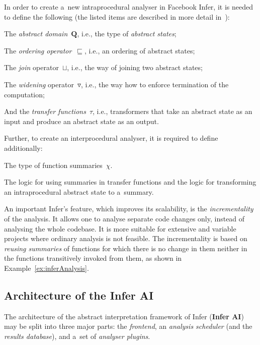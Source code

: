 \documentclass{ExcelAtFIT}
\theoremstyle{example}
\begin{document}
In order to create a~new intraprocedural analyser in Facebook Infer, it is needed to define the following (the listed items are described in more detail in~\cite{harmimBP}):
\begin{enuminline}
    \item The \emph{abstract domain}~$ \boldsymbol{Q} $, i.e., the type of \emph{abstract states};

    \item The \emph{ordering operator}~$ \sqsubseteq $, i.e., an ordering of abstract states;

    \item The \emph{join} operator~$ \sqcup $, i.e., the way of joining two abstract states;

    \item The \emph{widening} operator~$ \triangledown $, i.e., the way how to enforce termination of the computation;

    \item And the \emph{transfer functions}~$ \tau $, i.e., transformers that take an abstract state as an input and produce an abstract state as an output.
\end{enuminline}
Further, to create an interprocedural analyser, it is required to define additionally:
\begin{enuminline}
    \item The type of function summaries~$ \chi $.

    \item The logic for using summaries in transfer functions and the logic for transforming an intraprocedural abstract state to a~summary.
\end{enuminline}

An important Infer's feature, which improves its scalability, is the \emph{incrementality} of the analysis. It allows one to analyse separate code changes only, instead of analysing the whole codebase. It is more suitable for extensive and variable projects where ordinary analysis is not feasible. The incrementality is based on \emph{reusing summaries} of functions for which there is no change in them neither in the functions transitively invoked from them, as shown in Example~\ref{ex:inferAnalysis}.

\subsection{Architecture of the Infer AI}
\label{sec:fbinferArch}

The architecture of the abstract interpretation framework of Infer (\textbf{Infer AI}) may be split into three major parts: the \emph{frontend}, an \emph{analysis scheduler} (and the \emph{results database}), and a~set of \emph{analyser plugins}.
\end{document}
